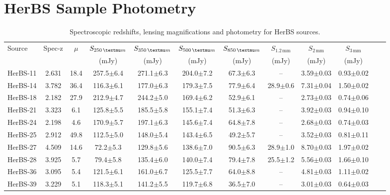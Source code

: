 \chapter{HerBS Sample Photometry}

\begin{landscape}
\begin{longtable}{lccccccccccr}

	\caption{Spectroscopic redshifts, lensing magnifications and photometry for HerBS sources.}
	\label{tab:data_herbs} \\
	\hline
	\hline
	Source & Spec-z & $\mu$ & $S_{250\,\micron}$ & $S_{350\,\micron}$ & $S_{500\,\micron}$ & $S_{850\,\micron}$ & $S_{1.2\,\textrm{mm}}$ & $S_{2\,\textrm{mm}}$ & $S_{3\,\textrm{mm}}$ \\
    & & & (mJy) & (mJy) & (mJy) & (mJy) & (mJy) & (mJy) & (mJy) \\
	\hline
    \hline
	HerBS-11 & 2.631 & 18.4 & 257.5$\pm$6.4 & 271.1$\pm$6.3 & 204.0$\pm$7.2 & 67.3$\pm$6.3 & -- & 3.59$\pm$0.03 & 0.93$\pm$0.02\\
	HerBS-14 & 3.782 & 36.4 & 116.3$\pm$6.1 & 177.0$\pm$6.3 & 179.3$\pm$7.5 & 77.9$\pm$6.4 & 28.9$\pm$0.6 & 7.31$\pm$0.04 & 1.50$\pm$0.02\\
	HerBS-18 & 2.182 & 27.9 & 212.9$\pm$4.7 & 244.2$\pm$5.0 & 169.4$\pm$6.2 & 52.9$\pm$6.1 & -- & 2.73$\pm$0.03 & 0.74$\pm$0.06\\
	HerBS-21 & 3.323 & 6.1 & 125.8$\pm$5.5 & 185.5$\pm$5.8 & 155.1$\pm$7.4 & 51.3$\pm$6.3 & -- & 3.92$\pm$0.03 & 0.94$\pm$0.10\\
	HerBS-24 & 2.198 & 4.6 & 170.9$\pm$5.7 & 197.1$\pm$6.3 & 145.6$\pm$7.4 & 64.8$\pm$7.8 & -- & 2.68$\pm$0.03 & 0.74$\pm$0.03\\
	HerBS-25 & 2.912 & 49.8 & 112.5$\pm$5.0 & 148.0$\pm$5.4 & 143.4$\pm$6.5 & 49.2$\pm$5.7 & -- & 3.52$\pm$0.03 & 0.81$\pm$0.11\\
	HerBS-27 & 4.509 & 14.6 & 72.2$\pm$5.3 & 129.8$\pm$5.6 & 138.6$\pm$7.0 & 90.5$\pm$6.3 & 28.9$\pm$1.0 & 8.70$\pm$0.03 & 1.97$\pm$0.02\\
	HerBS-28 & 3.925 & 5.7 & 79.4$\pm$5.8 & 135.4$\pm$6.0 & 140.0$\pm$7.4 & 79.4$\pm$7.8 & 25.5$\pm$1.2 & 5.56$\pm$0.03 & 1.66$\pm$0.10\\
	HerBS-36 & 3.095 & 5.4 & 121.5$\pm$6.1 & 161.0$\pm$6.7 & 125.5$\pm$7.7 & 64.0$\pm$8.8 & -- & 4.81$\pm$0.03 & 1.11$\pm$0.02\\
	HerBS-39 & 3.229 & 5.1 & 118.3$\pm$5.1 & 141.2$\pm$5.5 & 119.7$\pm$6.8 & 36.5$\pm$7.0 & -- & 3.01$\pm$0.03 & 0.64$\pm$0.03\\

\end{longtable}
\end{landscape}
